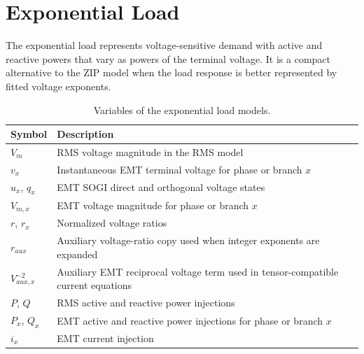 \section{Exponential Load}

The exponential load represents voltage-sensitive demand with active and reactive powers that vary as powers of the terminal voltage. It is a compact alternative to the ZIP model when the load response is better represented by fitted voltage exponents.

\begin{table}[H]
    \centering
    \caption{Variables of the exponential load models.}
    \begin{tabular}{ll}
        \toprule
        Symbol & Description \\
        \midrule
        $V_m$ & RMS voltage magnitude in the RMS model \\
        $v_x$ & Instantaneous EMT terminal voltage for phase or branch $x$ \\
        $u_x$, $q_x$ & EMT SOGI direct and orthogonal voltage states \\
        $V_{m,x}$ & EMT voltage magnitude for phase or branch $x$ \\
        $r$, $r_x$ & Normalized voltage ratios \\
        $r_{aux}$ & Auxiliary voltage-ratio copy used when integer exponents are expanded \\
        $V^{-2}_{aux,x}$ & Auxiliary EMT reciprocal voltage term used in tensor-compatible current equations \\
        $P$, $Q$ & RMS active and reactive power injections \\
        $P_x$, $Q_x$ & EMT active and reactive power injections for phase or branch $x$ \\
        $i_x$ & EMT current injection \\
        \bottomrule
    \end{tabular}
\end{table}

